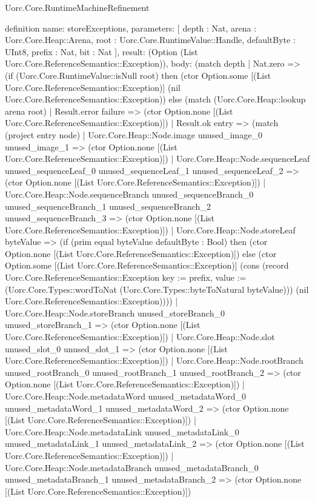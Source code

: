 \begin{lexlean}{Uorc.Core.RuntimeMachineRefinement}
\begin{semanticmodule}
definition{
  name: storeExceptions,
  parameters: [
    depth : Nat,
    arena : Uorc.Core.Heap::Arena,
    root : Uorc.Core.RuntimeValue::Handle,
    defaultByte : UInt8,
    prefix : Nat,
    bit : Nat
  ],
  result: (Option (List Uorc.Core.ReferenceSemantics::Exception)),
  body: (match depth
    | Nat.zero => (if (Uorc.Core.RuntimeValue::isNull root) then (ctor Option.some [(List Uorc.Core.ReferenceSemantics::Exception)] (nil Uorc.Core.ReferenceSemantics::Exception)) else (match (Uorc.Core.Heap::lookup arena root)
      | Result.error failure => (ctor Option.none [(List Uorc.Core.ReferenceSemantics::Exception)])
      | Result.ok entry => (match (project entry node)
        | Uorc.Core.Heap::Node.image unused_image_0 unused_image_1 => (ctor Option.none [(List Uorc.Core.ReferenceSemantics::Exception)])
        | Uorc.Core.Heap::Node.sequenceLeaf unused_sequenceLeaf_0 unused_sequenceLeaf_1 unused_sequenceLeaf_2 => (ctor Option.none [(List Uorc.Core.ReferenceSemantics::Exception)])
        | Uorc.Core.Heap::Node.sequenceBranch unused_sequenceBranch_0 unused_sequenceBranch_1 unused_sequenceBranch_2 unused_sequenceBranch_3 => (ctor Option.none [(List Uorc.Core.ReferenceSemantics::Exception)])
        | Uorc.Core.Heap::Node.storeLeaf byteValue => (if (prim equal byteValue defaultByte : Bool) then (ctor Option.none [(List Uorc.Core.ReferenceSemantics::Exception)]) else (ctor Option.some [(List Uorc.Core.ReferenceSemantics::Exception)] (cons (record Uorc.Core.ReferenceSemantics::Exception {key := prefix, value := (Uorc.Core.Types::wordToNat (Uorc.Core.Types::byteToNatural byteValue))}) (nil Uorc.Core.ReferenceSemantics::Exception))))
        | Uorc.Core.Heap::Node.storeBranch unused_storeBranch_0 unused_storeBranch_1 => (ctor Option.none [(List Uorc.Core.ReferenceSemantics::Exception)])
        | Uorc.Core.Heap::Node.slot unused_slot_0 unused_slot_1 => (ctor Option.none [(List Uorc.Core.ReferenceSemantics::Exception)])
        | Uorc.Core.Heap::Node.rootBranch unused_rootBranch_0 unused_rootBranch_1 unused_rootBranch_2 => (ctor Option.none [(List Uorc.Core.ReferenceSemantics::Exception)])
        | Uorc.Core.Heap::Node.metadataWord unused_metadataWord_0 unused_metadataWord_1 unused_metadataWord_2 => (ctor Option.none [(List Uorc.Core.ReferenceSemantics::Exception)])
        | Uorc.Core.Heap::Node.metadataLink unused_metadataLink_0 unused_metadataLink_1 unused_metadataLink_2 => (ctor Option.none [(List Uorc.Core.ReferenceSemantics::Exception)])
        | Uorc.Core.Heap::Node.metadataBranch unused_metadataBranch_0 unused_metadataBranch_1 unused_metadataBranch_2 => (ctor Option.none [(List Uorc.Core.ReferenceSemantics::Exception)])
}
\end{semanticmodule}
\end{lexlean}
